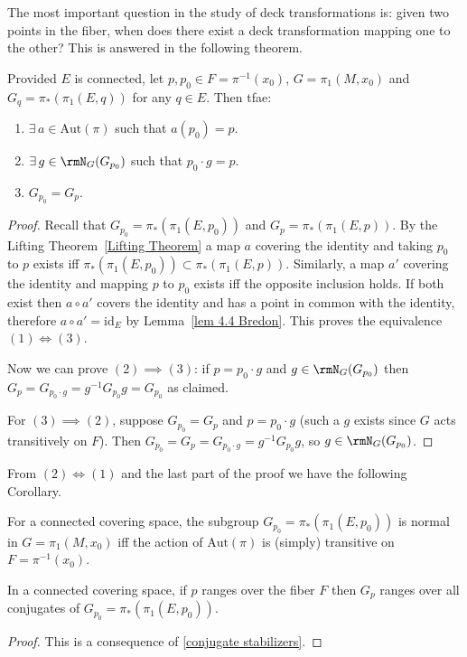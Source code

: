 The most important question in the study of deck transformations is: given two points in the fiber, when does there exist a deck transformation mapping one to the other? This is answered in the following theorem.
\begin{thm}\label{thm 6.3 Bredon}
    Provided $E$ is connected, let $p,p_0\in F=\pi^{-1}(x_0)$, $G=\pi_1(M,x_0)$ and $G_{q}=\pi_\ast(\pi_1(E,q))$ for any $q\in E$. Then \gls{tfae}:
    \begin{enumerate}[label=(\arabic*)]
        \item $\exists\, a\in \mathrm{Aut}(\pi)$ such that $a(p_0)=p$.
        \item $\exists\, g\in \rmN_G(G_{p_0})$ such that $p_0\cdot g=p$.
        \item $G_{p_0}=G_p$.
    \end{enumerate}
\end{thm}
\begin{proof}
    Recall that $G_{p_0}=\pi_\ast(\pi_1(E,p_0))$ and $G_{p}=\pi_\ast(\pi_1(E,p))$. By the Lifting Theorem~\ref{Lifting Theorem} a map $a$ covering the identity and taking $p_0$ to $p$ exists iff $\pi_\ast(\pi_1(E,p_0))\subset \pi_\ast(\pi_1(E,p))$. Similarly, a map $a'$ covering the identity and mapping $p$ to $p_0$ exists iff the opposite inclusion holds. If both exist then $a\circ a'$ covers the identity and has a point in common with the identity, therefore $a\circ a'=\mathrm{id}_E$ by Lemma~\ref{lem 4.4 Bredon}. This proves the equivalence $(1)\Leftrightarrow (3)$.

    Now we can prove $(2)\implies(3)$: if $p=p_0\cdot g$ and $g\in \rmN_G(G_{p_0})$ then $G_p=G_{p_0\cdot g}=g^{-1}G_{p_0}g=G_{p_0}$ as claimed.

    For $(3)\implies (2)$, suppose $G_{p_0}=G_p$ and $p=p_0\cdot g$ (such a $g$ exists since $G$ acts transitively on $F$). Then $G_{p_0}=G_p=G_{p_0\cdot g}=g^{-1}G_{p_0}g$, so $g\in \rmN_G(G_{p_0})$.
\end{proof}
From $(2)\Leftrightarrow(1)$ and the last part of the proof we have the following Corollary.
\begin{cor}\label{cor 6.4 Bredon}
    For a connected covering space, the subgroup $G_{p_0}=\pi_\ast(\pi_1(E,p_0))$ is normal in $G=\pi_1(M,x_0)$ iff the action of $\mathrm{Aut}(\pi)$ is (simply) transitive on $F=\pi^{-1}(x_0)$.
\end{cor}
\begin{cor}\label{cor 6.5 Bredon}
    In a connected covering space, if $p$ ranges over the fiber $F$ then $G_p$ ranges over all conjugates of $G_{p_0}=\pi_\ast(\pi_1(E,p_0))$.
\end{cor}
\begin{proof}
    This is a consequence of \eqref{conjugate stabilizers}.
\end{proof}

